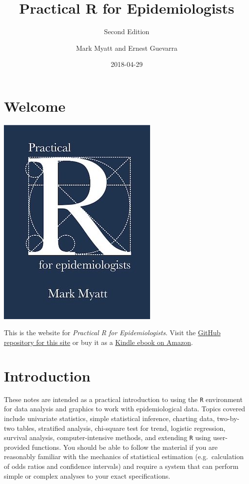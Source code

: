 \documentclass[12pt,]{book}
\title{Practical R for Epidemiologists}
\subtitle{Second Edition}
\author{Mark Myatt and Ernest Guevarra}
\date{2018-04-29}
\theoremstyle{definition}
\theoremstyle{definition}
\theoremstyle{definition}
\theoremstyle{remark}
\begin{document}
\maketitle

{
\hypersetup{linkcolor=black}
\setcounter{tocdepth}{1}
\tableofcontents
}
\hypertarget{welcome}{%
\chapter*{Welcome}\label{welcome}}

\includegraphics{images/bookcover_medium.jpg}

This is the website for \emph{Practical R for Epidemiologists}. Visit
the
\href{https://github.com/ernestguevarra/practical-r-for-epidemiologists}{GitHub
repository for this site} or buy it as a
\href{https://www.amazon.co.uk/Practical-R-Epidemiologists-Mark-Myatt-ebook/dp/B00DQATKIE/ref=sr_1_1?ie=UTF8\&qid=1524423427\&sr=8-1\&keywords=practical+r+for+epidemiologists}{Kindle
ebook on Amazon}.

\hypertarget{introduction}{%
\chapter*{Introduction}\label{introduction}}

These notes are intended as a practical introduction to using the
\texttt{R} environment for data analysis and graphics to work with
epidemiological data. Topics covered include univariate statistics,
simple statistical inference, charting data, two-by-two tables,
stratified analysis, chi-square test for trend, logistic regression,
survival analysis, computer-intensive methods, and extending \texttt{R}
using user-provided functions. You should be able to follow the material
if you are reasonably familiar with the mechanics of statistical
estimation (e.g.~calculation of odds ratios and confidence intervals)
and require a system that can perform simple or complex analyses to your
exact specifications.
\end{document}
